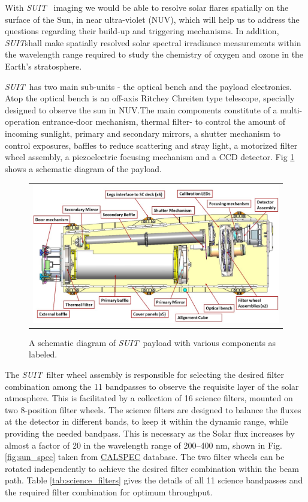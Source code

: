 \documentclass[12pt]{spieman}  %
\newcommand{\suit}{{\it{SUIT}}}
\begin{document}
 With \suit~ imaging we would be able to resolve solar flares spatially on the surface of the Sun, in near ultra-violet (NUV), which will help us to address the questions regarding their build-up and triggering mechanisms. In addition, \suit shall make spatially resolved solar spectral irradiance measurements within the wavelength range required to study the chemistry of oxygen and ozone in the Earth's stratosphere.

\suit~has two main sub-units - the optical bench and the payload electronics. Atop the optical bench is an off-axis Ritchey Chreiten type telescope, specially designed to observe the sun in NUV.The main components constitute of a multi-operation entrance-door mechanism, thermal filter- to control the amount of incoming sunlight, primary and secondary mirrors, a shutter mechanism to control exposures, baffles to reduce scattering and stray light, a motorized filter wheel assembly, a piezoelectric focusing mechanism and a CCD detector. Fig \ref{fig:suit} shows a schematic diagram of the payload.

\begin{figure}[ht!]
\begin{center}
\begin{tabular}{c}
\includegraphics[width=0.8\linewidth]{SUITLayout.jpg}
\end{tabular}
\end{center}
\caption 
{ \label{fig:suit} A schematic diagram of \suit~payload with various components as labeled. } 
\end{figure} 

The \suit~filter wheel assembly is responsible for selecting the desired filter combination among the 11 bandpasses to observe the requisite layer of the solar atmosphere. This is facilitated by a collection of 16 science filters, mounted on two 8-position filter wheels. The science filters are designed to balance the fluxes at the detector in different bands, to keep it within the dynamic range, while providing the needed bandpass. This is necessary as the Solar flux increases by almost a factor of 20 in the wavelength range of 200{--}400 nm, shown in Fig. \ref{fig:sun_spec} taken from \href{https://www.stsci.edu/hst/instrumentation/reference-data-for-calibration-and-tools/astronomical-catalogs/calspec}{CALSPEC} database. The two filter wheels can be rotated independently to achieve the desired filter combination within the beam path. Table \ref{tab:science_filters} gives the details of all 11 science bandpasses and the required filter combination for optimum throughput.
\end{document}
